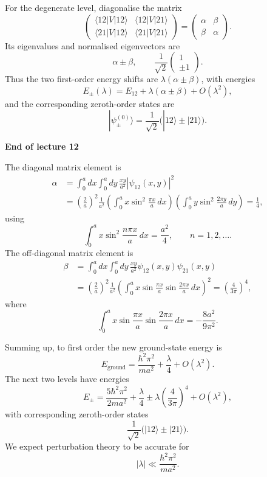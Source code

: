 \documentclass[11pt,a4paper]{article}
\begin{document}
For the degenerate level, diagonalise the matrix
\[
    \begin{pmatrix}
        \langle12|V|12\rangle&\langle12|V|21\rangle\\
        \langle21|V|12\rangle&\langle21|V|21\rangle
    \end{pmatrix}
      =\begin{pmatrix}\alpha&\beta\\\beta&\alpha\end{pmatrix}.
\]
Its eigenvalues and normalised eigenvectors are
\[
    \alpha\pm\beta,
    \qquad
    \frac{1}{\sqrt2}\begin{pmatrix}1\\\pm1\end{pmatrix}.
\]
Thus the two first-order energy shifts are
$\lambda(\alpha\pm\beta)$, with energies
\[
    E_\pm(\lambda)=E_{12}+\lambda(\alpha\pm\beta)+O(\lambda^2),
\]
and the corresponding zeroth-order states are
\[
    |\psi_\pm^{(0)}\rangle
       =\frac{1}{\sqrt2}\bigl(|12\rangle\pm|21\rangle\bigr).
\]

\begin{center}
    \textbf{End of lecture 12}
\end{center}
\clearpage
The diagonal matrix element is
\begin{align*}
    \alpha
      &=\int_0^a dx\int_0^a dy\,
          \frac{xy}{a^2}|\psi_{12}(x,y)|^2\\
      &=\left(\frac2a\right)^2\frac1{a^2}
        \left(\int_0^a x\sin^2\frac{\pi x}{a}\,dx\right)
        \left(\int_0^a y\sin^2\frac{2\pi y}{a}\,dy\right)
       =\frac14,
\end{align*}
using
\[
    \int_0^a x\sin^2\frac{n\pi x}{a}\,dx=\frac{a^2}{4},
    \qquad n=1,2,\ldots.
\]
The off-diagonal matrix element is
\begin{align*}
    \beta
      &=\int_0^a dx\int_0^a dy\,
        \frac{xy}{a^2}\psi_{12}(x,y)\psi_{21}(x,y)\\
      &=\left(\frac2a\right)^2\frac1{a^2}
        \left(\int_0^a x\sin\frac{\pi x}{a}
                            \sin\frac{2\pi x}{a}\,dx\right)^2
       =\left(\frac4{3\pi}\right)^4,
\end{align*}
where
\[
    \int_0^a x\sin\frac{\pi x}{a}\sin\frac{2\pi x}{a}\,dx
      =-\frac{8a^2}{9\pi^2}.
\]

Summing up, to first order the new ground-state energy is
\[
    E_{\mathrm{ground}}
      =\frac{\hbar^2\pi^2}{ma^2}+\frac{\lambda}{4}+O(\lambda^2).
\]
The next two levels have energies
\[
    E_\pm=\frac{5\hbar^2\pi^2}{2ma^2}
         +\frac{\lambda}{4}
         \pm\lambda\left(\frac4{3\pi}\right)^4+O(\lambda^2),
\]
with corresponding zeroth-order states
\[
    \frac1{\sqrt2}\bigl(|12\rangle\pm|21\rangle\bigr).
\]
We expect perturbation theory to be accurate for
\[
    |\lambda|\ll\frac{\hbar^2\pi^2}{ma^2}.
\]
\end{document}
